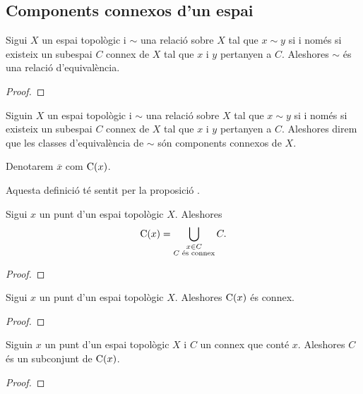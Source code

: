 \documentclass[../../Main.tex]{subfiles}
\begin{document}
	\subsection{Components connexos d'un espai}
	\begin{proposition}
		\label{prop:components connexos}
		Sigui \(X\) un espai topològic i \(\sim\) una relació sobre \(X\) tal que \(x\sim y\) si i només si existeix un subespai \(C\) connex de \(X\) tal que \(x\) i \(y\) pertanyen a \(C\). Aleshores \(\sim\) és una relació d'equivalència.
		\begin{proof}
		\end{proof}
	\end{proposition}
	\begin{definition}
		\label{def:compontents connexos}
		Siguin \(X\) un espai topològic i \(\sim\) una relació sobre \(X\) tal que \(x\sim y\) si i només si existeix un subespai \(C\) connex de \(X\) tal que \(x\) i \(y\) pertanyen a \(C\). Aleshores direm que les classes d'equivalència de \(\sim\) són components connexos de \(X\).
		
		Denotarem \(\overline{x}\) com \(\operatorname{C}(x)\).
		
		Aquesta definició té sentit per la proposició .
	\end{definition}
	\begin{proposition}
		\label{prop:el component connex d'un punt és la unió dels connexos que el contenen}
		Sigui \(x\) un punt d'un espai topològic \(X\). Aleshores
		\[
		    \operatorname{C}(x)=\bigcup_{\substack{x\in C\\C\text{ és connex}}}C.
		\] %
		\begin{proof}
		\end{proof}
	\end{proposition}
	\begin{proposition}
		\label{prop:el component connex d'un punt és connex}
		Sigui \(x\) un punt d'un espai topològic \(X\). Aleshores \(\operatorname{C}(x)\) és connex.
		\begin{proof}
		\end{proof}
	\end{proposition}
	\begin{proposition}
		\label{prop:el component connex d'un punt conté tots els connexos que contenen el punt}
		Siguin \(x\) un punt d'un espai topològic \(X\) i \(C\) un connex que conté \(x\). Aleshores \(C\) és un subconjunt de \(\operatorname{C}(x)\).
		\begin{proof}
		\end{proof}
	\end{proposition}
\end{document}
